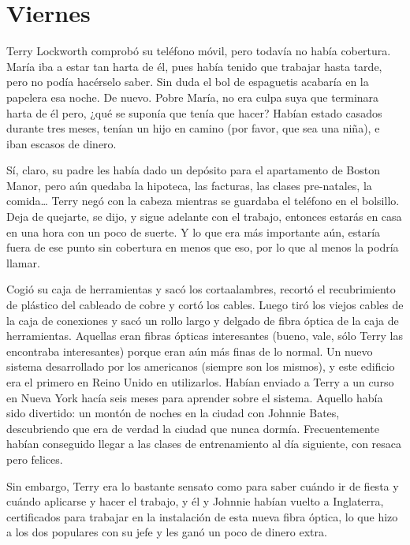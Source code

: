 \chapter*{Viernes}

Terry Lockworth comprobó su teléfono móvil, pero todavía no había
cobertura. María iba a estar tan harta de él, pues había tenido que
trabajar hasta tarde, pero no podía hacérselo saber. Sin duda el bol de
espaguetis acabaría en la papelera esa noche. De nuevo. Pobre María, no
era culpa suya que terminara harta de él pero, ¿qué se suponía que tenía
que hacer? Habían estado casados durante tres meses, tenían un hijo
en camino (por favor, que sea una niña), e iban escasos de dinero.

Sí, claro, su padre les había dado un depósito para el apartamento de
Boston Manor, pero aún quedaba la hipoteca, las facturas, las clases
pre-natales, la comida\ldots{} Terry negó con la cabeza mientras se
guardaba el teléfono en el bolsillo. Deja de quejarte, se dijo, y sigue
adelante con el trabajo, entonces estarás en casa en una hora con un
poco de suerte. Y lo que era más importante aún, estaría fuera de ese
punto sin cobertura en menos que eso, por lo que al menos la podría
llamar.

Cogió su caja de herramientas y sacó los cortaalambres, recortó el
recubrimiento de plástico del cableado de cobre y cortó los cables.
Luego tiró los viejos cables de la caja de conexiones y sacó un rollo
largo y delgado de fibra óptica de la caja de herramientas. Aquellas
eran fibras ópticas interesantes (bueno, vale, sólo Terry las encontraba
interesantes) porque eran aún más finas de lo normal. Un nuevo sistema
desarrollado por los americanos (siempre son los mismos), y este
edificio era el primero en Reino Unido en utilizarlos. Habían enviado a
Terry a un curso en Nueva York hacía seis meses para aprender sobre el
sistema. Aquello había sido divertido: un montón de noches en la ciudad
con Johnnie Bates, descubriendo que era de verdad la ciudad que nunca
dormía. Frecuentemente habían conseguido llegar a las clases de
entrenamiento al día siguiente, con resaca pero felices.

Sin embargo, Terry era lo bastante sensato como para saber cuándo ir de
fiesta y cuándo aplicarse y hacer el trabajo, y él y Johnnie habían
vuelto a Inglaterra, certificados para trabajar en la instalación de
esta nueva fibra óptica, lo que hizo a los dos populares con su jefe y
les ganó un poco de dinero extra.

